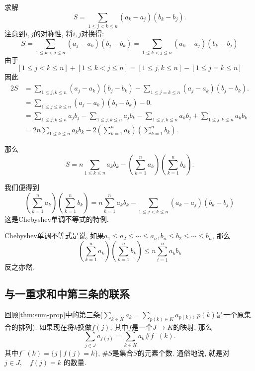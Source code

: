 \documentclass{ctexart}
\begin{document}
\begin{example}
	求解
	$$
		S=\sum_{1 \leqslant j<k \leqslant n}\left(a_k-a_j\right)\left(b_k-b_j\right).
	$$
	注意到$i,j$的对称性, 将$i,j$对换得:
	$$
		S=\sum_{1 \leqslant k<j \leqslant n}\left(a_j-a_k\right)\left(b_j-b_k\right)=\sum_{1 \leqslant k<j \leqslant n}\left(a_k-a_j\right)\left(b_k-b_j\right)
	$$
	由于
	$$
		[1 \leqslant j<k \leqslant n]+[1 \leqslant k<j \leqslant n]=[1 \leqslant j, k \leqslant n]-[1 \leqslant j=k \leqslant n]
	$$
	因此
	$$
		\begin{aligned}
			2 S & =\sum_{1 \leqslant j, k \leqslant n}\left(a_j-a_k\right)\left(b_j-b_k\right)-\sum_{1 \leqslant j=k \leqslant n}\left(a_j-a_k\right)\left(b_j-b_k\right) .                    \\
			    & =\sum_{1 \leqslant j \leqslant k \leqslant n}\left(a_j-a_k\right)\left(b_j-b_k\right)-0 .                                                                                    \\
			    & = \boxed{\sum_{1 \leq j, k \leqslant n} a_j b_j}-\sum_{1 \leq j, k \leq n} a_j b_k-\sum_{1 \leq j, k \leqslant n} a_k b_j+\boxed{\sum_{1\leqslant j, k \leqslant n} a_k b_k} \\
			    & = \boxed{2 n \sum_{1 \leqslant k \leqslant n} a_k b_k}-2\left(\sum_{k=1}^n a_k\right)\left(\sum_{k=1}^n b_k\right) .
		\end{aligned}
	$$

	那么
	$$
		S=n \sum_{1 \leqslant k \leqslant n} a_k b_k-\left(\sum_{k=1}^n a_k\right)\left(\sum_{k=1}^n b_k\right) .
	$$

	我们便得到
	$$
		\left(\sum_{k=1}^n a_k\right)\left(\sum_{k=1}^n b_k\right)=n \sum_{k=1}^n a_k b_k-\sum_{1 \leqslant j<k \leqslant n}\left(a_k-a_j\right)\left(b_k-b_j\right)
	$$
	这是Chebyshev单调不等式的特例.

	Chebyshev单调不等式是说, 如果$a_1 \leqslant a_2 \leqslant \cdots \leqslant a_n, b_n \leqslant b_2 \leqslant \cdots \leqslant b_n$, 那么
	$$
		\left(\sum_{k=1}^n a_k\right)\left(\sum_{k=1}^n b_k\right) \leqslant n \sum_{i=1}^n a_k b_k
	$$
	反之亦然.
\end{example}

\subsection{与一重求和中第三条的联系} 回顾\cref{thm:sum-prop}中的第三条($\sum_{k \in K} a_k=\sum_{p(k) \in K} a_{p(k)}$, $p(k)$是一个原集合的排列). 如果现在将$k$换做$f(j)$, 其中$f$是一个$J\to K$的映射, 那么
$$
	\sum_{j \in J} a_{f(j)}=\sum_{k \in K} a_k \# f^{-}(k) .
$$
其中$f^{-}(k)=\{j \mid f(j)=k\}$, $\#S$是集合$S$的元素个数. 通俗地说, 就是对 $j \in J ,\quad f(j)=k$ 的数量.
\end{document}
